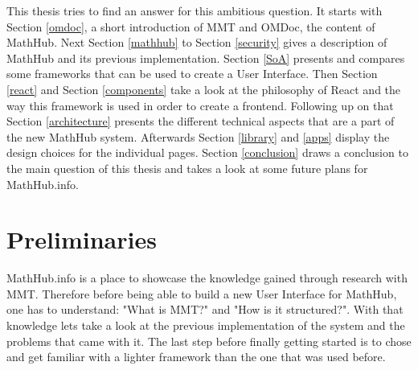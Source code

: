 \documentclass[11pt,a4paper]{article}
\begin{document}
\newline \newline
This thesis tries to find an answer for this ambitious question. It starts with Section \ref{omdoc}, a short introduction of  MMT and OMDoc, the content of MathHub. 
Next Section \ref{mathhub} to Section \ref{security} gives a description of MathHub and its previous implementation.
Section \ref{SoA} presents and compares some frameworks that can be used to create a User Interface.
Then Section \ref{react} and  Section \ref{components} take a look at the philosophy of React and the way this framework is used in order to create a frontend.
Following up on that Section \ref{architecture} presents the different technical aspects that are a part of the new MathHub system.
Afterwards Section \ref{library} and \ref{apps} display the design choices for the individual pages.
Section \ref{conclusion} draws a conclusion to the main question of this thesis and takes a look at some future plans for MathHub.info.
\newpage
\section{Preliminaries} \label{preliminaries}
MathHub.info is a place to showcase the knowledge gained through research with MMT.
Therefore before being able to build a new User Interface for MathHub, one has to understand: "What is MMT?" and "How is it structured?".
With that knowledge lets take a look at the previous implementation of the system and the problems that came with it.
The last step before finally getting started is to chose and get familiar with a lighter framework than the one that was used before.
\end{document}
